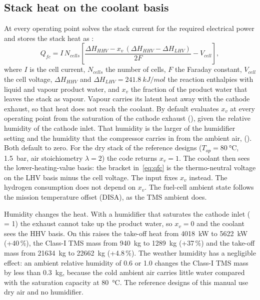 \documentclass[a4paper,11pt]{article}
\newcommand{\Qfc}{Q_{fc}}
\begin{document}
\subsection{Stack heat on the coolant basis}
At every operating point  solves the stack current for the
required electrical power and stores the stack heat as :
\begin{equation}
  \Qfc = I\,N_{cells}\left[\frac{\Delta H_{HHV} - x_v\,(\Delta H_{HHV} - \Delta H_{LHV})}{2F} - V_{cell}\right],
  \label{eq:qfc}
\end{equation}
where $I$ is the cell current, $N_{cells}$ the number of cells, $F$ the Faraday constant,
$V_{cell}$ the cell voltage, $\Delta H_{HHV}$ and $\Delta H_{LHV} = \SI{241.8}{kJ/mol}$ the
reaction enthalpies with liquid and vapour product water, and $x_v$ the fraction of the
product water that leaves the stack as vapour. Vapour carries its latent heat away with the
cathode exhaust, so that heat does not reach the coolant. By default
 evaluates $x_v$ at every operating point from the
saturation of the cathode exhaust (), given the
relative humidity of the cathode inlet. That humidity is the larger of the humidifier
setting  and the humidity that the compressor
carries in from the ambient air, 
(). Both default to zero. For the dry stack of the
reference designs ($T_{op} = \SI{80}{\celsius}$, \SI{1.5}{bar}, air stoichiometry
$\lambda = 2$) the code returns $x_v = 1$. The coolant then sees the
lower-heating-value basis: the bracket in~\eqref{eq:qfc} is the thermo-neutral voltage on
the LHV basis minus the cell voltage. The input
 fixes $x_v$ instead. The hydrogen
consumption does not depend on $x_v$. The fuel-cell ambient state follows the mission
temperature offset (DISA), as the TMS ambient does. 

Humidity changes the heat. With a humidifier that saturates the cathode inlet
( = 1) the exhaust cannot take up the product water, so $x_v = 0$
and the coolant sees the HHV basis. On  this raises the
take-off heat from \SI{4018}{kW} to \SI{5622}{kW} (+40\,\%), the Class-I TMS mass from
\SI{940}{kg} to \SI{1289}{kg} (+37\,\%) and the take-off mass from \SI{21634}{kg} to
\SI{22662}{kg} (+4.8\,\%). The weather humidity has a negligible effect: an ambient relative
humidity of 0.6 or 1.0 changes the Class-I TMS mass by less than \SI{0.3}{kg}, because the
cold ambient air carries little water compared with the saturation capacity at
\SI{80}{\celsius}. The reference designs of this manual use dry air and no humidifier.
\end{document}
